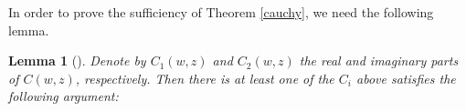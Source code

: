 \documentclass[11pt,a4paper]{amsart}
\numberwithin{equation}{section}
\newtheorem{lemma}[theorem]{Lemma}
\begin{document}
{%
%
%
%
%




In order to prove the sufficiency of Theorem \ref{cauchy}, we need the following lemma.

\begin{lemma}[\cite{DLLWW}]\label{nc}
Denote by $ C_1(w,z)$ and $ C_2(w,z)$
the real and imaginary parts of $ C(w,z)$, respectively.
Then there is  at least one of the $C_i$ above satisfies the following argument:


\end{lemma}}
\end{document}
